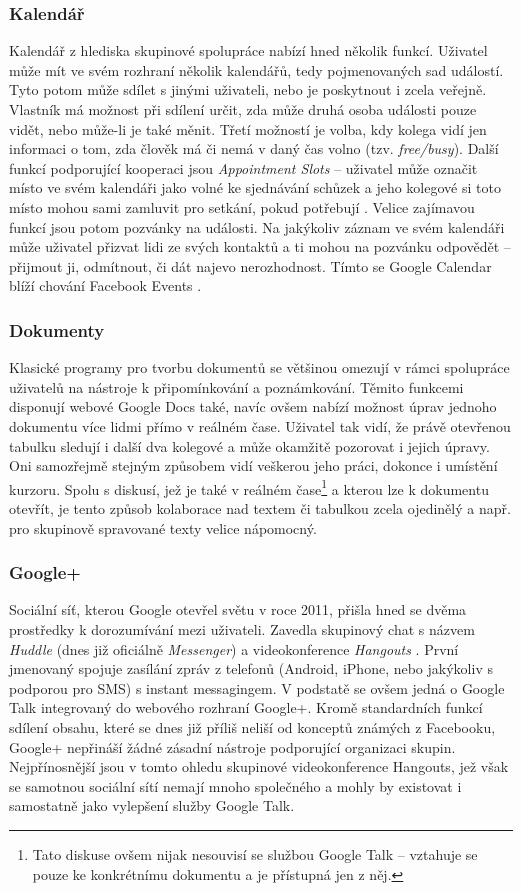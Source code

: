 \documentclass[12pt,oneside,final]{fithesis2}
\begin{document}
\subsubsection*{Kalendář}
Kalendář z hlediska skupinové spolupráce nabízí hned několik funkcí. Uživatel může mít ve svém rozhraní několik kalendářů, tedy pojmenovaných sad událostí. Tyto potom může sdílet s jinými uživateli, nebo je poskytnout i zcela veřejně. Vlastník má možnost při sdílení určit, zda může druhá osoba události pouze vidět, nebo může-li je také měnit. Třetí možností je volba, kdy kolega vidí jen informaci o tom, zda člověk má či nemá v daný čas volno (tzv. {\it free/busy}). Další funkcí podporující kooperaci jsou {\it Appointment Slots} -- uživatel může označit místo ve svém kalendáři jako volné ke sjednávání schůzek a jeho kolegové si toto místo mohou sami zamluvit pro setkání, pokud potřebují \cite{chung2010introducing}. Velice zajímavou funkcí jsou potom pozvánky na události. Na jakýkoliv záznam ve svém kalendáři může uživatel přizvat lidi ze svých kontaktů a ti mohou na pozvánku odpovědět -- přijmout ji, odmítnout, či dát najevo nerozhodnost. Tímto se Google Calendar blíží chování Facebook Events \cite{florescu2010insert}.

\subsubsection*{Dokumenty}
Klasické programy pro tvorbu dokumentů se většinou omezují v rámci spolupráce uživatelů na nástroje k připomínkování a poznámkování. Těmito funkcemi disponují webové Google Docs také, navíc ovšem nabízí možnost úprav jednoho dokumentu více lidmi přímo v reálném čase. Uživatel tak vidí, že právě otevřenou tabulku sledují i další dva kolegové a může okamžitě pozorovat i jejich úpravy. Oni samozřejmě stejným způsobem vidí veškerou jeho práci, dokonce i umístění kurzoru. Spolu s diskusí, jež je také v reálném čase\footnote{Tato diskuse ovšem nijak nesouvisí se službou Google Talk -- vztahuje se pouze ke konkrétnímu dokumentu a je přístupná jen z něj.} a kterou lze k dokumentu otevřít, je tento způsob kolaborace nad textem či tabulkou zcela ojedinělý a např. pro skupinově spravované texty velice nápomocný.

\subsubsection*{Google+}
Sociální síť, kterou Google otevřel světu v roce 2011, přišla hned se dvěma  prostředky k dorozumívání mezi uživateli. Zavedla skupinový chat s názvem {\it Huddle} (dnes již oficiálně {\it Messenger}) a videokonference {\it Hangouts} \cite{gundotra2010introducing}. První jmenovaný spojuje zasílání zpráv z telefonů (Android, iPhone, nebo jakýkoliv s podporou pro SMS) s instant messagingem. V podstatě se ovšem jedná o Google Talk integrovaný do webového rozhraní Google+. Kromě standardních funkcí sdílení obsahu, které se dnes již příliš neliší od konceptů známých z Facebooku, Google+ nepřináší žádné zásadní nástroje podporující organizaci skupin. Nejpřínosnější jsou v tomto ohledu skupinové videokonference Hangouts, jež však se samotnou sociální sítí nemají mnoho společného a mohly by existovat i samostatně jako vylepšení služby Google Talk.
\end{document}
